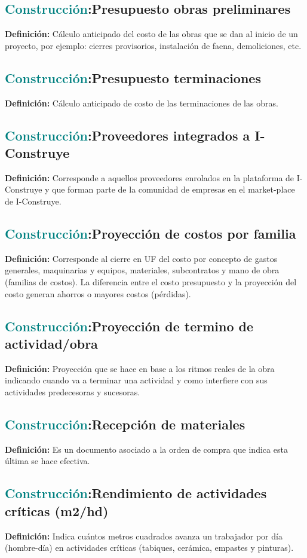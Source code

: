 \documentclass[12pt]{article}
\begin{document}
\subsection{\textcolor{teal}{Construcción}:{Presupuesto obras preliminares}}
\textbf{Definición:} Cálculo anticipado del costo de las obras que se dan al inicio de un proyecto, por ejemplo: cierres provisorios, instalación de faena, demoliciones, etc.
\subsection{\textcolor{teal}{Construcción}:{Presupuesto terminaciones}}
\textbf{Definición:} Cálculo anticipado de costo de las terminaciones de las obras.
\subsection{\textcolor{teal}{Construcción}:{Proveedores integrados a I-Construye}}
\textbf{Definición:} Corresponde a aquellos proveedores enrolados en la plataforma de I-Construye y que forman parte de la comunidad de empresas en el market-place de I-Construye.
\subsection{\textcolor{teal}{Construcción}:{Proyección de costos por familia}}
\textbf{Definición:} Corresponde al cierre en UF del costo por concepto de gastos generales, maquinarias y equipos, materiales, subcontratos y mano de obra (familias de costos). La diferencia entre el costo presupuesto y la proyección del costo generan ahorros o mayores costos (pérdidas).
\subsection{\textcolor{teal}{Construcción}:{Proyección de termino de actividad/obra}}
\textbf{Definición:} Proyección que se hace en base a los ritmos reales de la obra indicando cuando va a terminar una actividad y como interfiere con sus actividades predecesoras y sucesoras.
\subsection{\textcolor{teal}{Construcción}:{Recepción de materiales}}
\textbf{Definición:} Es un documento asociado a la orden de compra que indica esta última se hace efectiva.
\subsection{\textcolor{teal}{Construcción}:{Rendimiento de actividades críticas (m2/hd)}}
\textbf{Definición:} Indica cuántos metros cuadrados avanza un trabajador por día (hombre-día) en actividades críticas (tabiques, cerámica, empastes y pinturas).
\end{document}
